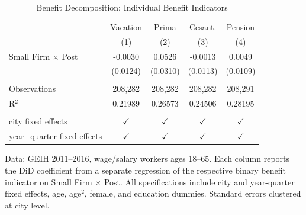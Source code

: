 
\begin{table}[htbp]
   \caption{\label{tab:decomp} Benefit Decomposition: Individual Benefit Indicators}
   \bigskip
   \centering
   \begin{tabular}{lcccc}
      \toprule
                                   & Vacation      & Prima         & Cesant.       & Pension \\   
                                   & (1)           & (2)           & (3)           & (4)\\  
      \midrule 
      Small Firm $\times$ Post     & -0.0030       & 0.0526        & -0.0013       & 0.0049\\   
                                   & (0.0124)      & (0.0310)      & (0.0113)      & (0.0109)\\   
       \\
      Observations                 & 208,282       & 208,282       & 208,282       & 208,291\\  
      R$^2$                        & 0.21989       & 0.26573       & 0.24506       & 0.28195\\  
       \\
      city fixed effects           & $\checkmark$  & $\checkmark$  & $\checkmark$  & $\checkmark$\\   
      year\_quarter fixed effects  & $\checkmark$  & $\checkmark$  & $\checkmark$  & $\checkmark$\\   
      \bottomrule
   \end{tabular}
   
   \par \raggedright 
   Data: GEIH 2011--2016, wage/salary workers ages 18--65. Each column reports the DiD coefficient from a separate regression of the respective binary benefit indicator on Small Firm $\times$ Post. All specifications include city and year-quarter fixed effects, age, age$^2$, female, and education dummies. Standard errors clustered at city level.
\end{table}


